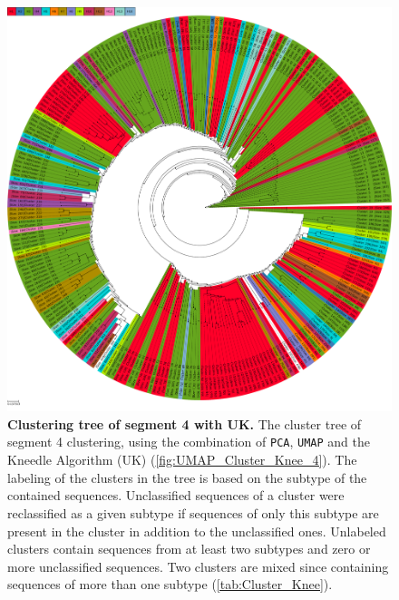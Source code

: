 \begin{figure}[!hbt]
    \centering
    \includegraphics[width=\textwidth]{UMAP/Clustertree_Segment_4_H_Knee.pdf}
    \caption[Clustering tree of segment 4 with UK]{\textbf{Clustering tree of segment 4 with UK.} The cluster tree of segment 4 clustering, using the combination of \texttt{PCA}, \texttt{UMAP} and the Kneedle Algorithm (UK) (\autoref{fig:UMAP_Cluster_Knee_4}). The labeling of the clusters in the tree is based on the subtype of the contained sequences. Unclassified sequences of a cluster were reclassified as a given subtype if sequences of only this subtype are present in the cluster in addition to the unclassified ones. Unlabeled clusters contain sequences from at least two subtypes and zero or more unclassified sequences. Two clusters are mixed since containing sequences of more than one subtype (\autoref{tab:Cluster_Knee}).}
    \label{fig:UMAP_Clusteree_Knee_4}
\end{figure}

